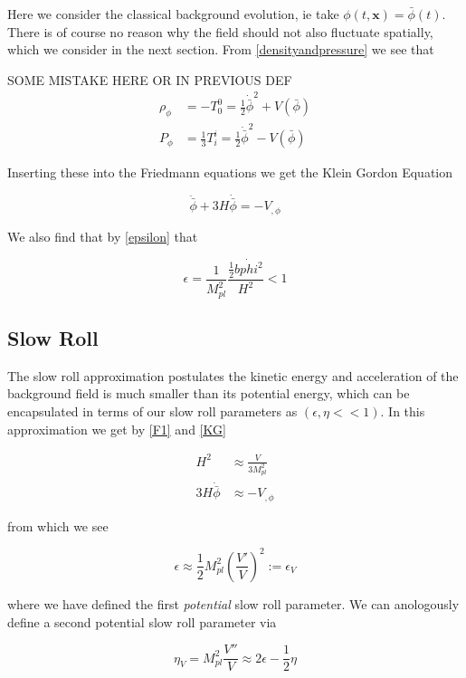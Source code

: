 \documentclass[a4paper,11pt]{article}
\renewcommand{\v}[1]{\mathbf{#1}}
\newcommand{\Mp}{M_{pl}}
\newcommand{\half}{\frac{1}{2}}
\newcommand{\bphi}{\bar{\phi}}
\begin{document}
Here we consider the classical background evolution, ie take $\phi(t,\v{x}) = \bphi(t)$. There is of course no reason why the field should not also fluctuate spatially, which we consider in the next section. From \ref{densityandpressure} we see that 


SOME MISTAKE HERE OR IN PREVIOUS DEF
\begin{align}
\rho_\phi &=-T^0_0 = \half \dot{\bphi}^2+V(\bphi)\\
P_\phi&=\frac{1}{3}T^i_i = \half \dot{\bphi}^2-V(\bphi)
\end{align}

Inserting these into the Friedmann equations we get the Klein Gordon Equation

\begin{equation}
\tag{KG}
\ddot{\bphi}+3H\dot{\bphi}=-V_{,\phi}
\end{equation}

We also find that by \ref{epsilon} that 

\begin{equation}
\epsilon = \frac{1}{\Mp^2}\frac{\half\dot{bphi^2}}{H^2} < 1
\end{equation}

\subsection{Slow Roll}

The slow roll approximation postulates the kinetic energy and acceleration of the background field is much smaller than its potential energy, which can be encapsulated in terms of our slow roll parameters as $(\epsilon, \eta << 1)$. In this approximation we get by \ref{F1} and \ref{KG} 

\begin{align}
H^2 &\approx \frac{V}{3\Mp^2} \\
3H\dot{\bphi} &\approx -V_{,\phi}
\end{align}

from which we see 

\begin{equation}
\epsilon \approx \half\Mp^2 (\frac{V'}{V})^2 := \epsilon_V
\end{equation}

where we have defined the first \textit{potential} slow roll parameter. We can anologously define a second potential slow roll parameter via

\begin{equation}
\eta_V = \Mp^2 \frac{V''}{V} \approx 2\epsilon - \half\eta
\end{equation}
\end{document}
